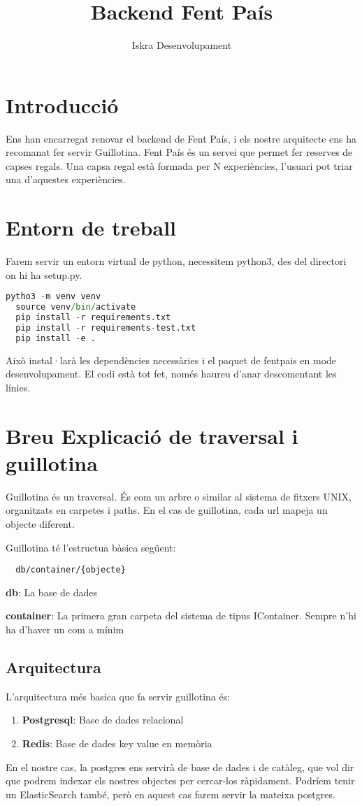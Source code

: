 \documentclass[a4paper, 11pt]{article}
\title{Backend Fent País}
\author{Iskra Desenvolupament}
\begin{document}
\maketitle
\tableofcontents

\section{Introducció}
Ens han encarregat renovar el backend de Fent País, i els nostre
arquitecte ens ha recomanat fer servir Guillotina. Fent País és un
servei que permet fer reserves de capses regals. Una capsa regal està
formada per N experiències, l'usuari pot triar una d'aquestes
experiències.

\section{Entorn de treball}
Farem servir un entorn virtual de python, necessitem python3, des del
directori on hi ha setup.py.

\begin{lstlisting}[language=Python, caption=Entorn virtual]
  pytho3 -m venv venv
  source venv/bin/activate
  pip install -r requirements.txt
  pip install -r requirements-test.txt
  pip install -e .
\end{lstlisting}

Això instal·larà les dependències necessàries i el paquet de fentpais
en mode desenvolupament. El codi està tot fet, només haureu d'anar
descomentant les línies.

\section{Breu Explicació de traversal i guillotina}
Guillotina és un traversal. És com un arbre o similar al sistema de
fitxers UNIX, organitzats en carpetes i paths. En el cas de
guillotina, cada url mapeja un objecte diferent.

Guillotina té l'estructua bàsica següent:
\begin{lstlisting}
  db/container/{objecte}
\end{lstlisting}

\textbf{db}: La base de dades

\textbf{container}: La primera gran carpeta del sistema de tipus
IContainer. Sempre n'hi ha d'haver un com a mínim
\subsection{Arquitectura}
L'arquitectura més basica que fa servir guillotina és:
\begin{enumerate}
\item \textbf{Postgresql}: Base de dades relacional
\item \textbf{Redis}: Base de dades key value en memòria
\end{enumerate}
En el nostre cas, la postgres ens servirà de base de dades i de
catàleg, que vol dir que podrem indexar els nostres objectes per
cercar-los ràpidament. Podríem tenir un ElasticSearch també, però en
aquest cas farem servir la mateixa postgres.
\end{document}
